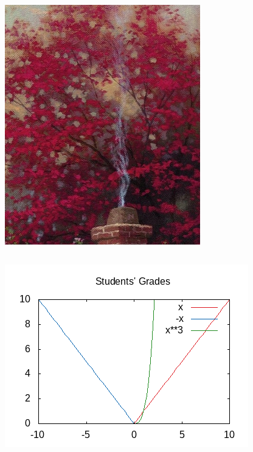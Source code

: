 \documentclass[presentation]{beamer}
\begin{document}
\section{}
\label{sec:orga4f60be}
\begin{center}
\includegraphics[width=.9\linewidth]{imgs/avatar.png}
\end{center}
\begin{columns}
\begin{column}{0.45\columnwidth}
\begin{block}{}
\begin{center}
\includegraphics[width=.9\linewidth]{imgs/grades.png}
\end{center}
\end{block}
\end{column}
\end{columns}
\end{document}
